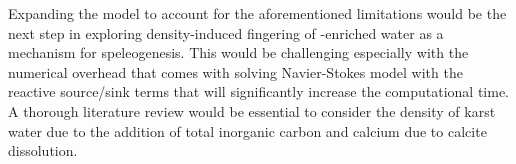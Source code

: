 Expanding the model to account for the aforementioned limitations would be the next step in exploring density-induced fingering 
of -enriched water as a mechanism for speleogenesis. This would be challenging especially with the numerical overhead 
that comes with solving Navier-Stokes model with the reactive source/sink terms that will significantly increase the computational time. 
A thorough literature review would be essential to consider the density of karst water due to the addition of total inorganic carbon and calcium due to 
calcite dissolution.


\endinput

